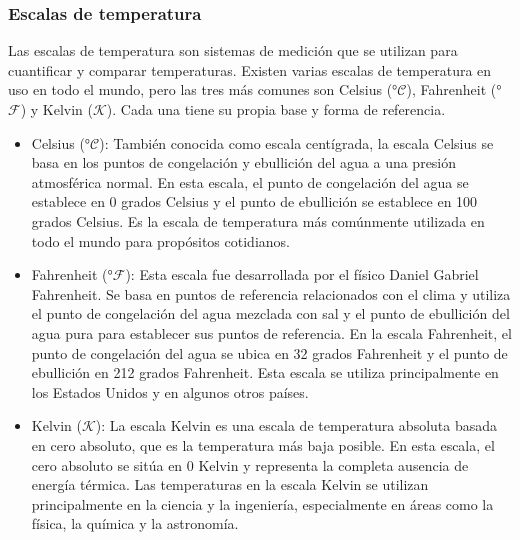 \documentclass[letterpaper, 12pt]{article}
\newcommand{\Celsius}[0]{°$\mathcal{C}$}
\newcommand{\Kelvin}[0]{$\mathcal{K}$}
\newcommand{\Fahrenheit}[0]{°$\mathcal{F}$}
\begin{document}
\subsubsection{Escalas de temperatura~\cite{escalas_de_temperatura}}

Las escalas de temperatura son sistemas de medición que se
utilizan para cuantificar y comparar temperaturas. Existen
varias escalas de temperatura en uso en todo el mundo, pero
las tres más comunes son Celsius (\Celsius), Fahrenheit
(\Fahrenheit) y Kelvin (\Kelvin). Cada una tiene su propia
base y forma de referencia.

\begin{itemize}[label=$\triangleright$]
      \item Celsius (\Celsius): También conocida como escala
            centígrada, la escala Celsius se basa en los puntos de
            congelación y ebullición del agua a una presión atmosférica
            normal. En esta escala, el punto de congelación del agua se
            establece en 0 grados Celsius y el punto de ebullición se
            establece en 100 grados Celsius. Es la escala de
            temperatura más comúnmente utilizada en todo el mundo para
            propósitos cotidianos.

      \item Fahrenheit (\Fahrenheit): Esta escala fue desarrollada por
            el físico Daniel Gabriel Fahrenheit. Se basa en puntos de
            referencia relacionados con el clima y utiliza el punto de
            congelación del agua mezclada con sal y el punto de
            ebullición del agua pura para establecer sus puntos de
            referencia. En la escala Fahrenheit, el punto de
            congelación del agua se ubica en 32 grados Fahrenheit y el
            punto de ebullición en 212 grados Fahrenheit. Esta escala
            se utiliza principalmente en los Estados Unidos y en
            algunos otros países.

      \item Kelvin (\Kelvin): La escala Kelvin es una escala de
            temperatura absoluta basada en cero absoluto, que es la
            temperatura más baja posible. En esta escala, el cero
            absoluto se sitúa en 0 Kelvin y representa la completa
            ausencia de energía térmica. Las temperaturas en la escala
            Kelvin se utilizan principalmente en la ciencia y la
            ingeniería, especialmente en áreas como la física, la
            química y la astronomía.
\end{itemize}
\end{document}
